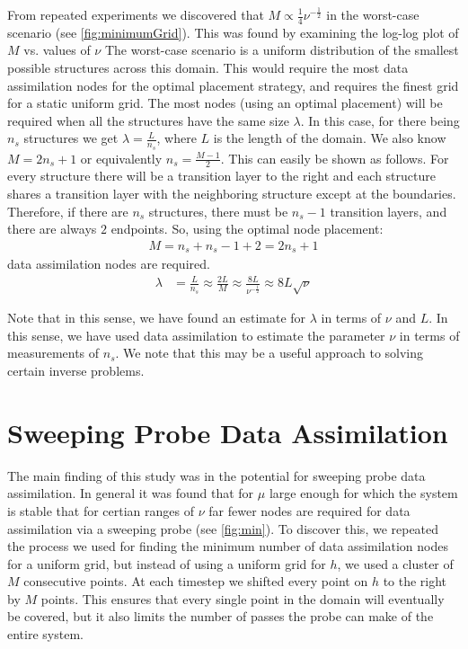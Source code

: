 \documentclass[12pt]{amsart}
\theoremstyle{plain}
\theoremstyle{definition}
\theoremstyle{remark}
\numberwithin{equation}{section} %
\numberwithin{figure}{section}   %
\begin{document}
From repeated experiments we discovered that $M \propto \frac{1}{4}\nu^{-\frac{1}{2}}$ in the worst-case scenario (see \ref{fig:minimumGrid}). This was found by examining the log-log plot of $M$ vs. values of $\nu$  The worst-case scenario is a uniform distribution of the smallest possible structures across this domain. This would require the most data assimilation nodes for the optimal placement strategy, and requires the finest grid for a static uniform grid. The most nodes (using an optimal placement) will be required when all the structures have the same size $\lambda$. In this case, for there being $n_s$ structures we get $\lambda = \frac{L}{n_s} $, where $L$ is the length of the domain. We also know $M = 2n_s + 1$ or equivalently $n_s = \frac{M-1}{2}$. This can easily be shown as follows. For every structure there will be a transition layer to the right and each structure shares a transition layer with the neighboring structure except at the boundaries. Therefore, if there are $n_s$ structures, there must be $n_s - 1$ transition layers, and there are always $2$ endpoints. So, using the optimal node placement: 
\begin{align*}
M = n_s +n_s-1 +2 = 2n_s + 1
\end{align*} data assimilation nodes are required.
\begin{align*}
\lambda & = \frac{L}{n_s} \approx\frac{2L}{M} \approx\frac{8L}{\nu^{-\frac{1}{2}}} \approx 8L\sqrt{\nu}
\end{align*}

Note that in this sense, we have found an estimate for $\lambda$ in terms of $\nu$ and $L$. In this sense, we have used data assimilation to estimate the parameter $\nu$ in terms of measurements of $n_s$. We note that this may be a useful approach to solving certain inverse problems.
 \section{Sweeping Probe Data Assimilation}\label{secNeatSection}
\noindent
The main finding of this study was in the potential for sweeping probe data assimilation. In general it was found that for $\mu$ large enough for which the system is stable that for certian ranges of $\nu$ far fewer nodes are required for data assimilation via a sweeping probe (see \cref{fig:min}). To discover this, we repeated the process we used for finding the minimum number of data assimilation nodes for a uniform grid, but instead of using a uniform grid for $h$, we used a cluster of $M$ consecutive points. At each timestep we shifted every point on $h$ to the right by $M$ points. This ensures that every single point in the domain will eventually be covered, but it also limits the number of passes the probe can make of the entire system. 
\end{document}

